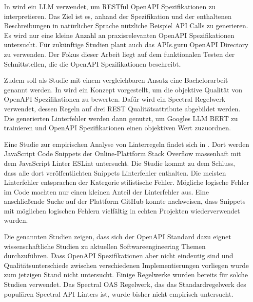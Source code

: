 In \parencite{kim_leveraging_2024} wird ein \acf{LLM} verwendet, um \acs{REST}ful OpenAPI Spezifikationen zu interpretieren. Das Ziel ist es, anhand der Spezifikation und der enthaltenen Beschreibungen in natürlicher Sprache nützliche Beispiel \acs{API} Calls zu generieren. Es wird nur eine kleine Anzahl an praxisrelevanten OpenAPI Spezifikationen untersucht. Für zukünftige Studien plant \parencite{kim_leveraging_2024} auch das APIs.guru OpenAPI Directory zu verwenden. Der Fokus dieser Arbeit liegt auf dem funktionalen Testen der Schnittstellen, die die OpenAPI Spezifikationen beschreibt.

Zudem soll als Studie mit einem vergleichbaren Ansatz eine Bachelorarbeit genannt werden. In \parencite{eriksson_using_2023} wird ein Konzept vorgestellt, um die objektive Qualität von OpenAPI Spezifikationen zu bewerten. Dafür wird ein Spectral Regelwerk verwendet, dessen Regeln auf drei REST Qualitätsattribute abgebildet werden. Die generierten Linterfehler werden dann genutzt, um Googles  \acs{LLM} BERT zu trainieren und OpenAPI Spezifikationen einen objektiven Wert zuzuordnen.

Eine Studie zur empirischen Analyse von Linterregeln findet sich in \parencite{ferreira_campos_mining_2019}. Dort werden JavaScript Code Snippets der Online-Plattform Stack Overflow massenhaft mit dem JavaScript Linter ESLint untersucht. Die Studie kommt zu dem Schluss, dass alle dort veröffentlichten Snippets Linterfehler enthalten. Die meisten Linterfehler entsprachen der Kategorie stilistische Fehler. Mögliche logische Fehler im Code machten nur einen kleinen Anteil der Linterfehler aus. Eine anschließende Suche auf der Plattform GitHub konnte nachweisen, dass Snippets mit möglichen logischen Fehlern vielfältig in echten Projekten wiederverwendet wurden. 

Die genannten Studien zeigen, dass sich der OpenAPI Standard dazu eignet wissenschaftliche Studien zu aktuellen Softwareengineering Themen durchzuführen. Dass OpenAPI Spezifikationen aber nicht eindeutig sind und Qualitätsunterschiede zwischen verschiedenen Implementierungen vorliegen wurde zum jetzigen Stand nicht untersucht. Einige Regelwerke wurden bereits für solche Studien verwendet. Das Spectral \acs{OAS} Regelwerk, das das Standardregelwerk des populären Spectral \acs{API} Linters ist, wurde bisher nicht empirisch untersucht.
